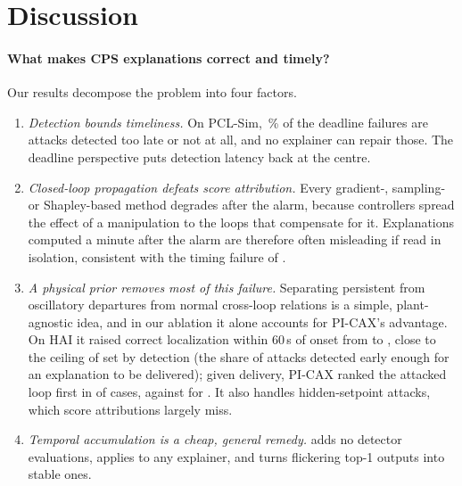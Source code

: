 \section{Discussion}\label{sec:discussion}

\paragraph{What makes CPS explanations correct and timely?}
Our results decompose the problem into four factors.
\begin{enumerate}
\item \emph{Detection bounds timeliness.} On PCL-Sim, \intimeFailUndeliveredPct\,\% of the deadline failures are attacks detected too late or not at all, and no explainer can repair those. The deadline perspective puts detection latency \citep{puccetti2026latency} back at the centre.
\item \emph{Closed-loop propagation defeats score attribution.} Every gradient-, sampling- or Shapley-based method degrades after the alarm, because controllers spread the effect of a manipulation to the loops that compensate for it. Explanations computed a minute after the alarm are therefore often misleading if read in isolation, consistent with the timing failure of \citet{fung2024attributions}.
\item \emph{A physical prior removes most of this failure.} Separating persistent from oscillatory departures from normal cross-loop relations is a simple, plant-agnostic idea, and in our ablation it alone accounts for PI-CAX's advantage. On HAI it raised correct localization within 60\,s of onset from \dclhaiLXdclfixedSixZerotea{} to \dclhaiPICAXdclfixedSixZerotea{}, close to the ceiling of \haiCeiling{} set by detection (the share of attacks detected early enough for an explanation to be delivered); given delivery, PI-CAX ranked the attacked loop first in \haiCondPICAX{} of cases, against \haiCondLX{} for \LX. It also handles hidden-setpoint attacks, which score attributions largely miss.
\item \emph{Temporal accumulation is a cheap, general remedy.} \TEA{} adds no detector evaluations, applies to any explainer, and turns flickering top-1 outputs into stable ones.
\end{enumerate}

